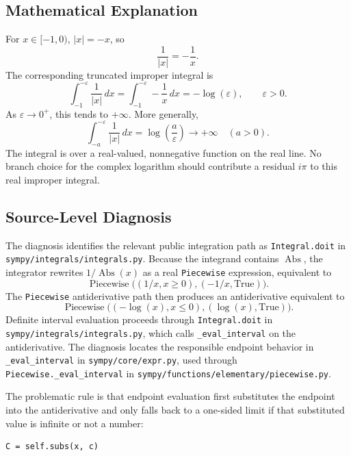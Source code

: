 \documentclass[11pt]{article}
\begin{document}
\subsection{Mathematical Explanation}

For \(x \in [-1,0)\), \(|x|=-x\), so
\[
  \frac{1}{|x|} = -\frac{1}{x}.
\]
The corresponding truncated improper integral is
\[
  \int_{-1}^{-\varepsilon} \frac{1}{|x|}\,dx
  =
  \int_{-1}^{-\varepsilon} -\frac{1}{x}\,dx
  =
  -\log(\varepsilon),
  \qquad \varepsilon>0.
\]
As \(\varepsilon \to 0^+\), this tends to \(+\infty\).  More generally,
\[
  \int_{-a}^{-\varepsilon} \frac{1}{|x|}\,dx
  = \log\!\left(\frac{a}{\varepsilon}\right)
  \to +\infty
  \quad (a>0).
\]
The integral is over a real-valued, nonnegative function on the real line.
No branch choice for the complex logarithm should contribute a residual
\(i\pi\) to this real improper integral.

\subsection{Source-Level Diagnosis}

The diagnosis identifies the relevant public integration path as
\texttt{Integral.doit} in \nolinkurl{sympy/integrals/integrals.py}.  Because
the integrand contains \(\operatorname{Abs}\), the integrator rewrites
\(1/\operatorname{Abs}(x)\) as a real \texttt{Piecewise} expression, equivalent
to
\[
  \operatorname{Piecewise}\bigl((1/x, x\ge 0),(-1/x,\mathrm{True})\bigr).
\]
The \texttt{Piecewise} antiderivative path then produces an antiderivative
equivalent to
\[
  \operatorname{Piecewise}\bigl((-\log(x), x\le 0),(\log(x),\mathrm{True})\bigr).
\]
Definite interval evaluation proceeds through \texttt{Integral.doit} in
\nolinkurl{sympy/integrals/integrals.py}, which calls \texttt{\_eval\_interval}
on the antiderivative.  The diagnosis locates the responsible endpoint
behavior in \texttt{\_eval\_interval} in \nolinkurl{sympy/core/expr.py}, used
through \texttt{Piecewise.\_eval\_interval} in
\nolinkurl{sympy/functions/elementary/piecewise.py}.

The problematic rule is that endpoint evaluation first substitutes the
endpoint into the antiderivative and only falls back to a one-sided limit if
that substituted value is infinite or not a number:

\begin{lstlisting}[style=bugpython]
C = self.subs(x, c)
\end{lstlisting}
\end{document}
